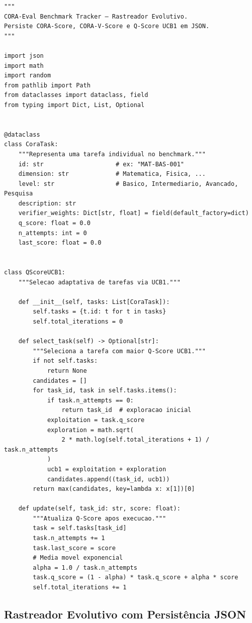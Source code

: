 \begin{lstlisting}[caption={cora\_benchmark\_tracker.py (abreviado)},
label={lst:cora-tracker}, style=pythonstyle]
"""
CORA-Eval Benchmark Tracker — Rastreador Evolutivo.
Persiste CORA-Score, CORA-V-Score e Q-Score UCB1 em JSON.
"""

import json
import math
import random
from pathlib import Path
from dataclasses import dataclass, field
from typing import Dict, List, Optional


@dataclass
class CoraTask:
    """Representa uma tarefa individual no benchmark."""
    id: str                    # ex: "MAT-BAS-001"
    dimension: str             # Matematica, Fisica, ...
    level: str                 # Basico, Intermediario, Avancado, Pesquisa
    description: str
    verifier_weights: Dict[str, float] = field(default_factory=dict)
    q_score: float = 0.0
    n_attempts: int = 0
    last_score: float = 0.0


class QScoreUCB1:
    """Selecao adaptativa de tarefas via UCB1."""

    def __init__(self, tasks: List[CoraTask]):
        self.tasks = {t.id: t for t in tasks}
        self.total_iterations = 0

    def select_task(self) -> Optional[str]:
        """Seleciona a tarefa com maior Q-Score UCB1."""
        if not self.tasks:
            return None
        candidates = []
        for task_id, task in self.tasks.items():
            if task.n_attempts == 0:
                return task_id  # exploracao inicial
            exploitation = task.q_score
            exploration = math.sqrt(
                2 * math.log(self.total_iterations + 1) / task.n_attempts
            )
            ucb1 = exploitation + exploration
            candidates.append((task_id, ucb1))
        return max(candidates, key=lambda x: x[1])[0]

    def update(self, task_id: str, score: float):
        """Atualiza Q-Score apos execucao."""
        task = self.tasks[task_id]
        task.n_attempts += 1
        task.last_score = score
        # Media movel exponencial
        alpha = 1.0 / task.n_attempts
        task.q_score = (1 - alpha) * task.q_score + alpha * score
        self.total_iterations += 1
\end{lstlisting}

\subsection{Rastreador Evolutivo com Persistência JSON}

